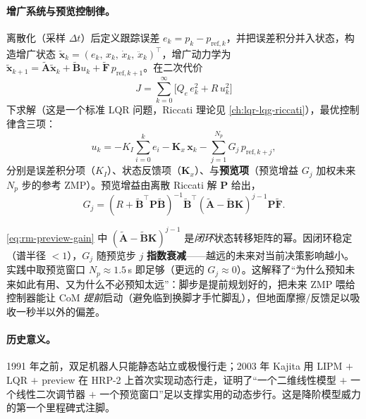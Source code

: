 \paragraph{增广系统与预览控制律。}
离散化（采样 $\Delta t$）后定义跟踪误差 $e_k=p_k-p_{\mathrm{ref},k}$，并把误差积分并入状态，构造增广状态 $\tilde{\mathbf{x}}_k=(e_k,\,x_k,\,\dot{x}_k,\,\ddot{x}_k)^\top$，增广动力学为 $\tilde{\mathbf{x}}_{k+1}=\tilde{\mathbf{A}}\tilde{\mathbf{x}}_k+\tilde{\mathbf{B}}u_k+\tilde{\mathbf{F}}\,p_{\mathrm{ref},k+1}$。在二次代价
\begin{equation}
  J=\sum_{k=0}^{\infty}\big[Q_e\,e_k^2+R\,u_k^2\big]
  \label{eq:rm-preview-cost}
\end{equation}
下求解（这是一个标准 LQR 问题，Riccati 理论见 \cref{ch:lqr-lqg-riccati}），最优控制律含三项：
\begin{equation}
  u_k=-K_I\sum_{i=0}^{k}e_i-\mathbf{K}_x\,\mathbf{x}_k-\sum_{j=1}^{N_p}G_j\,p_{\mathrm{ref},k+j},
  \label{eq:rm-preview-law}
\end{equation}
分别是误差积分项（$K_I$）、状态反馈项（$\mathbf{K}_x$）、与\textbf{预览项}（预览增益 $G_j$ 加权未来 $N_p$ 步的参考 ZMP）。预览增益由离散 Riccati 解 $\mathbf{P}$ 给出，
\begin{equation}
  G_j=(R+\tilde{\mathbf{B}}^\top\mathbf{P}\tilde{\mathbf{B}})^{-1}\tilde{\mathbf{B}}^\top
  (\tilde{\mathbf{A}}-\tilde{\mathbf{B}}\mathbf{K})^{j-1}\mathbf{P}\tilde{\mathbf{F}}.
  \label{eq:rm-preview-gain}
\end{equation}

\begin{insight}
\cref{eq:rm-preview-gain} 中 $(\tilde{\mathbf{A}}-\tilde{\mathbf{B}}\mathbf{K})^{j-1}$ 是\emph{闭环}状态转移矩阵的幂。因闭环稳定（谱半径 $<1$），$G_j$ 随预览步 $j$ \textbf{指数衰减}——越远的未来对当前决策影响越小。实践中取预览窗口 $N_p\approx 1.5$\,s 即足够（更远的 $G_j\approx 0$）。这解释了“为什么预知未来如此有用、又为什么不必预知太远”：脚步是提前规划好的，把未来 ZMP 喂给控制器能让 CoM \emph{提前}启动（避免临到换脚才手忙脚乱），但地面摩擦/反馈足以吸收一秒半以外的偏差。
\end{insight}

\paragraph{历史意义。}
1991 年之前，双足机器人只能静态站立或极慢行走；2003 年 Kajita 用 LIPM $+$ LQR $+$ preview 在 HRP-2 上首次实现动态行走\cite{kajita2001lipm}，证明了“一个二维线性模型 $+$ 一个线性二次调节器 $+$ 一个预览窗口”足以支撑实用的动态步行。这是降阶模型威力的第一个里程碑式注脚。

